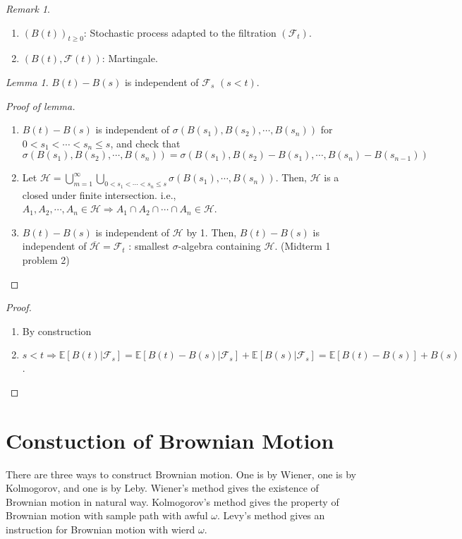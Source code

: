 \documentclass[12pt]{report}
\newcommand{\F}{\mathcal{F}}
\newcommand{\E}{\mathbb{E}}
\renewcommand{\1}{\mathbb{1}}
\theoremstyle{break}
\theoremstyle{newdef}
\theoremstyle{remark}
\newtheorem*{lem}{Lemma}
\newtheorem*{rem}{Remark} %
\begin{document}
\begin{rem}
\leavevmode
\begin{enumerate}
\item $(B(t))_{t\geq0}$: Stochastic process adapted to the filtration $(\F_t)$.
\item $(B(t), \F(t))$: Martingale.
\end{enumerate}

\begin{lem}
$B(t) - B(s)$ is independent of $\F_s$ $(s < t)$.
\begin{proof}[Proof of lemma]
\leavevmode
\begin{enumerate}
\item $B(t) - B(s)$ is independent of $\sigma (B(s_1), B(s_2), \cdots, B(s_n))$ for $0 < s_1 < \cdots < s_n \leq s$, and check that  $\sigma (B(s_1), B(s_2), \cdots, B(s_n)) = \sigma(B(s_1), B(s_2)-B(s_1), \cdots, B(s_n)-B(s_{n-1}))$ 
\item Let $\mathcal{H} = \bigcup_{m=1}^\infty\bigcup_{0 < s_1 < \cdots < s_n \leq s} \sigma(B(s_1), \cdots, B(s_n))$.
Then, $\mathcal{H}$ is a closed under finite intersection.
i.e., $A_1, A_2, \cdots, A_n \in \mathcal{H} \Rightarrow A_1 \cap A_2 \cap \cdots \cap A_n \in \mathcal{H}$.
\item $B(t) - B(s)$ is independent of $\mathcal{H}$ by 1.
Then, $B(t) - B(s)$ is independent of $\overline{\mathcal{H}} = \F_t$ : smallest $\sigma$-algebra containing $\mathcal{H}$. (Midterm 1 problem 2)
\end{enumerate}
\end{proof}
\end{lem}

\begin{proof}
\begin{enumerate}
\item By construction
\item $s < t \Rightarrow
\E[B(t)|\F_s] = \E[B(t)-B(s)|\F_s] + \E[B(s)|\F_s] = \E[B(t) - B(s)] + B(s)$.
\end{enumerate}
\end{proof}
\end{rem}




\chapter{Constuction of Brownian Motion}

There are three ways to construct Brownian motion.
One is by Wiener, one is by Kolmogorov, and one is by Leby.
Wiener's method gives the existence of Brownian motion in natural way.
Kolmogorov's method gives the property of Brownian motion with sample path with awful $\omega$.
Levy's method gives an instruction for Brownian motion with wierd $\omega$.
\end{document}
